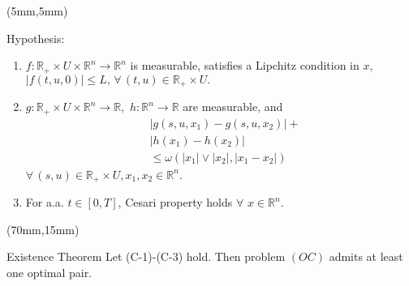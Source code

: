 \begin{frame}[plain]
    \begin{textblock*}{60mm}(5mm,5mm)
        \begin{graybox}{Hypothesis:}
            \begin{enumerate}[(\textbf{{C}}-1)]
                \item
                    $
                        f:\mathbb{R}_{+}\times U
                        \times \mathbb{R}^n\rightarrow 
                        \mathbb{R}^n
                    $ 
                    is measurable, satisfies a Lipchitz
                    condition in $x$,
                    $
                        |f(t,u,0)|\leq L,\,
                        \forall\,(t,u)\in
                        \mathbb{R}_{+}\times U .
                    $
                \item
                    $
                        g:\mathbb{R}_{+}\times U\times 
                        \mathbb{R}^n\rightarrow \mathbb{R},
                    $ 
                    $
                        h:\mathbb{R}^n\rightarrow \mathbb{R}
                    $ are measurable, and
                    \begin{align*}
                        &|g(s,u,x_1)-g(s,u,x_2)|+\\
                        &|h(x_1)-h(x_2)|\\
                        &\leq \omega(|x_1|\vee |x_2|,|x_1-x_2|)
                    \end{align*}
                    $
                        \forall\, (s,u)\in \mathbb{R}_{+}
                        \times U,x_1,x_2\in \mathbb{R}^n
                    $.
                \item
                    For a.a. $t\in[0,T]$, Cesari property holds $\forall$ $x\in 
                    \mathbb{R}^n$.
            \end{enumerate}	
        \end{graybox}
    \end{textblock*}
    \begin{textblock*}{55mm}(70mm,15mm)
        \begin{greenbox}{Existence Theorem}
            Let (C-1)-(C-3) hold. Then problem $(OC)$ admits at least one 
            optimal pair.
        \end{greenbox}
    \end{textblock*}
\end{frame}